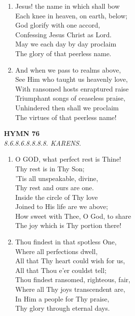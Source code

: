 \documentclass[11pt,a4paper]{article}
\begin{document}
\begin{enumerate}
    \item Jesus! the name in which shall bow \\
        Each knee in heaven, on earth, below; \\
        God glorify with one accord, \\
        Confessing Jesus Christ as Lord. \\
        May we each day by day proclaim \\
        The glory of that peerless name.

    \item And when we pass to realms above, \\
        See Him who taught us heavenly love, \\
        With ransomed hosts enraptured raise \\
        Triumphant songs of ceaseless praise, \\
        Unhindered then shall we proclaim \\
        The virtues of that peerless name!

\end{enumerate}

\newpage
\begin{center}
    {\Large \textbf{HYMN 76}}
    \\
    \textit{8.6.8.6.8.8.8.8. KARENS.}
\end{center}
\vspace{1em}

\begin{enumerate}
    \item O GOD, what perfect rest is Thine! \\
        Thy rest is in Thy Son; \\
        'Tis all unspeakable, divine, \\
        Thy rest and ours are one. \\
        Inside the circle of Thy love \\
        Joined to His life are we above; \\
        How sweet with Thee, O God, to share \\
        The joy which is Thy portion there!

    \item Thou findest in that spotless One, \\
        Where all perfections dwell, \\
        All that Thy heart could wish for us, \\
        All that Thou e'er couldst tell; \\
        Thou findest ransomed, righteous, fair, \\
        Where all Thy joys transcendent are, \\
        In Him a people for Thy praise, \\
        Thy glory through eternal days.

\end{enumerate}
\end{document}
